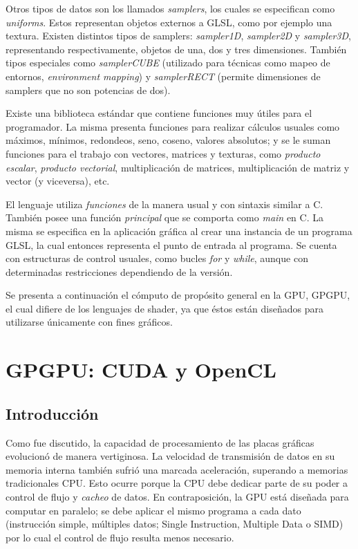 Otros tipos de datos son los llamados {\em samplers}, los cuales se especifican como {\em uniforms}. Estos representan objetos externos a GLSL, como por ejemplo una textura.
Existen distintos tipos de samplers: {\em sampler1D}, {\em sampler2D} y {\em sampler3D}, representando respectivamente, objetos de una, dos y tres dimensiones. Tambi\'en tipos especiales como {\em samplerCUBE} (utilizado para t\'ecnicas como mapeo de entornos, {\em environment mapping}) y {\em samplerRECT} (permite dimensiones de samplers que no son potencias de dos).

Existe una biblioteca est\'andar que contiene funciones muy \'utiles para el programador. La misma presenta funciones para realizar c\'alculos usuales como m\'aximos, m\'inimos, redondeos, seno, coseno, valores absolutos; y se le suman funciones para el trabajo con vectores, matrices y texturas, como {\em producto escalar}, {\em producto vectorial}, multiplicaci\'on de matrices, multiplicaci\'on de matriz y vector (y viceversa), etc.

El lenguaje utiliza {\em funciones} de la manera usual y con sintaxis similar a C.
Tambi\'en posee una funci\'on {\em principal} que se comporta como {\em main} en C.
La misma se especifica en la aplicaci\'on gr\'afica al crear una instancia de un programa GLSL, la cual entonces representa el punto de entrada al programa.
Se cuenta con estructuras de control usuales, como bucles {\em for} y {\em while}, aunque con determinadas restricciones dependiendo de la versión.

Se presenta a continuaci\'on el cómputo de prop\'osito general en la GPU, GPGPU, el cual difiere de los lenguajes de shader, ya que éstos est\'an dise\~nados para utilizarse \'unicamente con fines gr\'aficos.

\section{GPGPU: CUDA y OpenCL}

\subsection{Introducción}
Como fue discutido, la capacidad de procesamiento de las placas gr\'aficas evolucionó de manera vertiginosa.
La velocidad de transmisi\'on de datos en su memoria interna tambi\'en sufrió una marcada aceleración, superando a memorias tradicionales CPU.
Esto ocurre porque la CPU debe dedicar parte de su poder a control de flujo y {\em cacheo} de datos.
En contraposici\'on, la GPU est\'a dise\~nada para computar en paralelo; se debe aplicar el mismo programa a cada dato (instrucción simple, múltiples datos; Single Instruction, Multiple Data o \acrshort{SIMD}) por lo cual el control de flujo resulta menos necesario.


